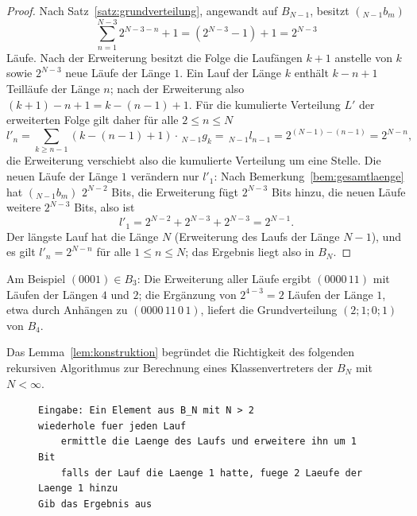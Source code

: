 \documentclass[11pt,a4paper]{scrartcl}
\theoremstyle{plain}
\theoremstyle{definition}
\theoremstyle{remark}
\begin{document}
\begin{proof}
Nach Satz~\ref{satz:grundverteilung}, angewandt auf $B_{N-1}$, besitzt
$({}_{N-1}b_m)$
\begin{equation*}
  \sum_{n=1}^{N-3}2^{N-3-n}+1=\left(2^{N-3}-1\right)+1=2^{N-3}
\end{equation*}
Läufe. Nach der Erweiterung besitzt die Folge die Laufängen $k+1$
anstelle von $k$ sowie $2^{N-3}$ neue Läufe der Länge $1$. Ein Lauf
der Länge $k$ enthält $k-n+1$ Teilläufe der Länge $n$; nach der
Erweiterung also $(k+1)-n+1=k-(n-1)+1$. Für die kumulierte Verteilung
$L'$ der erweiterten Folge gilt daher für alle $2\leq n\leq N$
\begin{equation*}
  l'_n=\sum_{k\geq n-1}\left(k-(n-1)+1\right)\cdot\,_{N-1}g_k
  =\,_{N-1}l_{n-1}=2^{(N-1)-(n-1)}=2^{N-n},
\end{equation*}
die Erweiterung verschiebt also die kumulierte Verteilung um eine
Stelle. Die neuen Läufe der Länge $1$ verändern nur $l'_1$: Nach
Bemerkung~\ref{bem:gesamtlaenge} hat $({}_{N-1}b_m)$ $2^{N-2}$ Bits,
die Erweiterung fügt $2^{N-3}$ Bits hinzu, die neuen Läufe weitere
$2^{N-3}$ Bits, also ist
\begin{equation*}
  l'_1=2^{N-2}+2^{N-3}+2^{N-3}=2^{N-1}.
\end{equation*}
Der längste Lauf hat die Länge $N$ (Erweiterung des Laufs der Länge
$N-1$), und es gilt $l'_n=2^{N-n}$ für alle $1\leq n\leq N$; das
Ergebnis liegt also in $B_N$.
\end{proof}

\noindent Am Beispiel $(0001)\in B_3$: Die Erweiterung aller Läufe
ergibt $(0000\,11)$ mit Läufen der Längen $4$ und $2$; die Ergänzung
von $2^{4-3}=2$ Läufen der Länge $1$, etwa durch Anhängen zu
$(0000\,11\,0\,1)$, liefert die Grundverteilung $(2;1;0;1)$ von $B_4$.

\noindent Das Lemma~\ref{lem:konstruktion} begründet die Richtigkeit
des folgenden rekursiven Algorithmus zur Berechnung eines
Klassenvertreters der $B_N$ mit $N<\infty$.

\begin{figure}[htbp]
\begin{lstlisting}[caption={Rekursive Berechnung einer Bitfolge aus einem B\_N},label={algo:rekursiv}]
Eingabe: Ein Element aus B_N mit N > 2
wiederhole fuer jeden Lauf
    ermittle die Laenge des Laufs und erweitere ihn um 1 Bit
    falls der Lauf die Laenge 1 hatte, fuege 2 Laeufe der Laenge 1 hinzu
Gib das Ergebnis aus
\end{lstlisting}
\end{figure}
\end{document}
